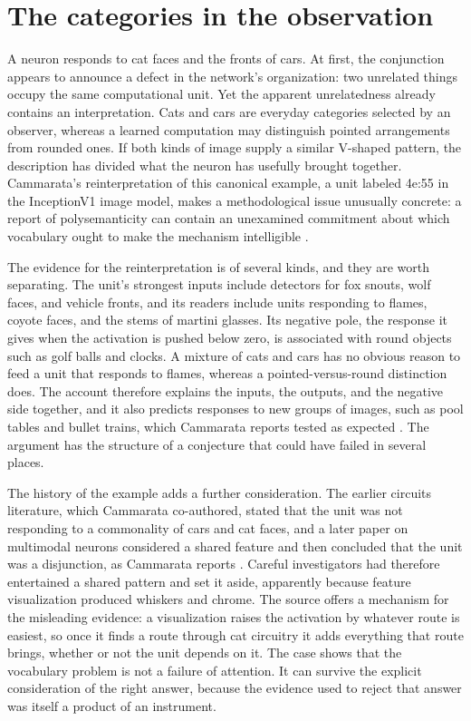 \documentclass[11pt]{article}
\begin{document}
\newpage
\section{The categories in the observation}

A neuron responds to cat faces and the fronts of cars. At first, the conjunction appears to announce a defect in the network's organization: two unrelated things occupy the same computational unit. Yet the apparent unrelatedness already contains an interpretation. Cats and cars are everyday categories selected by an observer, whereas a learned computation may distinguish pointed arrangements from rounded ones. If both kinds of image supply a similar V-shaped pattern, the description has divided what the neuron has usefully brought together. Cammarata's reinterpretation of this canonical example, a unit labeled 4e:55 in the InceptionV1 image model, makes a methodological issue unusually concrete: a report of polysemanticity can contain an unexamined commitment about which vocabulary ought to make the mechanism intelligible \cite{cammarata}.

The evidence for the reinterpretation is of several kinds, and they are worth separating. The unit's strongest inputs include detectors for fox snouts, wolf faces, and vehicle fronts, and its readers include units responding to flames, coyote faces, and the stems of martini glasses. Its negative pole, the response it gives when the activation is pushed below zero, is associated with round objects such as golf balls and clocks. A mixture of cats and cars has no obvious reason to feed a unit that responds to flames, whereas a pointed-versus-round distinction does. The account therefore explains the inputs, the outputs, and the negative side together, and it also predicts responses to new groups of images, such as pool tables and bullet trains, which Cammarata reports tested as expected \cite[\emph{Cars and Animals}]{cammarata}. The argument has the structure of a conjecture that could have failed in several places.

The history of the example adds a further consideration. The earlier circuits literature, which Cammarata co-authored, stated that the unit was not responding to a commonality of cars and cat faces, and a later paper on multimodal neurons \cite{goh2021} considered a shared feature and then concluded that the unit was a disjunction, as Cammarata reports \cite[\emph{Cars and Animals}]{cammarata}. Careful investigators had therefore entertained a shared pattern and set it aside, apparently because feature visualization produced whiskers and chrome. The source offers a mechanism for the misleading evidence: a visualization raises the activation by whatever route is easiest, so once it finds a route through cat circuitry it adds everything that route brings, whether or not the unit depends on it. The case shows that the vocabulary problem is not a failure of attention. It can survive the explicit consideration of the right answer, because the evidence used to reject that answer was itself a product of an instrument.
\end{document}
